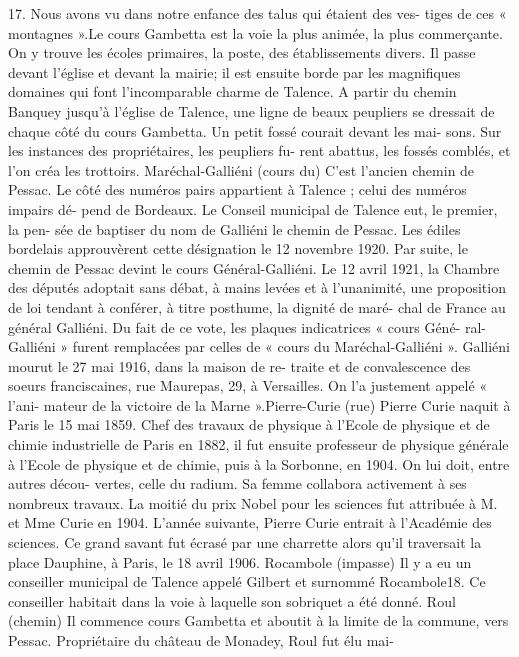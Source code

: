 \documentclass[a4paper,11pt]{book}
\begin{document}
17. Nous avons vu dans notre enfance des talus qui étaient des ves-
tiges de ces « montagnes ».Le cours Gambetta est la voie la plus animée, la plus
commerçante. On y trouve les écoles primaires, la poste,
des établissements divers. Il passe devant l'église et devant
la mairie; il est ensuite borde par les magnifiques domaines
qui font l'incomparable charme de Talence.
A partir du chemin Banquey jusqu'à l'église de Talence,
une ligne de beaux peupliers se dressait de chaque côté
du cours Gambetta. Un petit fossé courait devant les mai-
sons. Sur les instances des propriétaires, les peupliers fu-
rent abattus, les fossés comblés, et l'on créa les trottoirs.
Maréchal-Galliéni (cours du)
C'est l'ancien chemin de Pessac. Le côté des numéros
pairs appartient à Talence ; celui des numéros impairs dé-
pend de Bordeaux.
Le Conseil municipal de Talence eut, le premier, la pen-
sée de baptiser du nom de Galliéni le chemin de Pessac.
Les édiles bordelais approuvèrent cette désignation le 12
novembre 1920. Par suite, le chemin de Pessac devint le
cours Général-Galliéni.
Le 12 avril 1921, la Chambre des députés adoptait sans
débat, à mains levées et à l'unanimité, une proposition de
loi tendant à conférer, à titre posthume, la dignité de maré-
chal de France au général Galliéni.
Du fait de ce vote, les plaques indicatrices « cours Géné-
ral-Galliéni » furent remplacées par celles de « cours du
Maréchal-Galliéni ».
Galliéni mourut le 27 mai 1916, dans la maison de re-
traite et de convalescence des soeurs franciscaines, rue
Maurepas, 29, à Versailles. On l'a justement appelé « l'ani-
mateur de la victoire de la Marne ».Pierre-Curie (rue)
Pierre Curie naquit à Paris le 15 mai 1859. Chef des
travaux de physique à l'Ecole de physique et de chimie
industrielle de Paris en 1882, il fut ensuite professeur de
physique générale à l'Ecole de physique et de chimie, puis
à la Sorbonne, en 1904. On lui doit, entre autres décou-
vertes, celle du radium. Sa femme collabora activement à
ses nombreux travaux. La moitié du prix Nobel pour les
sciences fut attribuée à M. et Mme Curie en 1904.
L'année suivante, Pierre Curie entrait à l'Académie des
sciences.
Ce grand savant fut écrasé par une charrette alors qu'il
traversait la place Dauphine, à Paris, le 18 avril 1906.
Rocambole (impasse)
Il y a eu un conseiller municipal de Talence appelé
Gilbert et surnommé Rocambole18. Ce conseiller habitait
dans la voie à laquelle son sobriquet a été donné.
Roul (chemin)
Il commence cours Gambetta et aboutit à la limite de
la commune, vers Pessac.
Propriétaire du château de Monadey, Roul fut élu mai-
\end{document}
